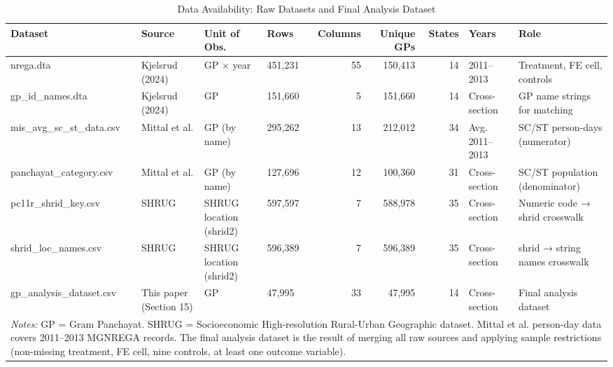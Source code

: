 \begin{table}[htbp]
\centering
\caption{Data Availability: Raw Datasets and Final Analysis Dataset}
\label{tab:data_availability}
\small
\begin{tabular}{llllrrrll}
\hline\hline
\textbf{Dataset} & \textbf{Source} & \textbf{Unit of Obs.} & \textbf{Rows} & \textbf{Columns} & \textbf{Unique GPs} & \textbf{States} & \textbf{Years} & \textbf{Role} \\
\hline
nrega.dta & Kjelsrud (2024) & GP × year & 451,231 & 55 & 150,413 & 14 & 2011–2013 & Treatment, FE cell, controls \\
gp\_id\_names.dta & Kjelsrud (2024) & GP & 151,660 & 5 & 151,660 & 14 & Cross-section & GP name strings for matching \\
mis\_avg\_sc\_st\_data.csv & Mittal et al. & GP (by name) & 295,262 & 13 & 212,012 & 34 & Avg. 2011–2013 & SC/ST person-days (numerator) \\
panchayat\_category.csv & Mittal et al. & GP (by name) & 127,696 & 12 & 100,360 & 31 & Cross-section & SC/ST population (denominator) \\
pc11r\_shrid\_key.csv & SHRUG & SHRUG location (shrid2) & 597,597 & 7 & 588,978 & 35 & Cross-section & Numeric code → shrid crosswalk \\
shrid\_loc\_names.csv & SHRUG & SHRUG location (shrid2) & 596,389 & 7 & 596,389 & 35 & Cross-section & shrid → string names crosswalk \\
gp\_analysis\_dataset.csv & This paper (Section 15) & GP & 47,995 & 33 & 47,995 & 14 & Cross-section & Final analysis dataset \\
\hline\hline
\multicolumn{9}{p{18cm}}{\footnotesize \textit{Notes:} GP = Gram Panchayat. SHRUG = Socioeconomic High-resolution Rural-Urban Geographic dataset. Mittal et al. person-day data covers 2011--2013 MGNREGA records. The final analysis dataset is the result of merging all raw sources and applying sample restrictions (non-missing treatment, FE cell, nine controls, at least one outcome variable).}
\end{tabular}
\end{table}
